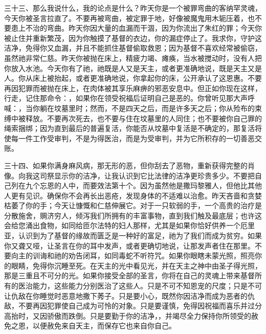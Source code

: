 三十三、那么我说什么，我的论点是什么？昨天你是一个被罪弯曲的客纳罕灵魂，今天你被圣言拉直了。不要再被弯曲，被定罪于地，好像被魔鬼用木轭压着，也不要患上不治的弯曲。昨天你因大量的血漏而干涸，因为你流出了朱红的罪；今天你被止住并重新繁茂，因为你触摸了基督的衣边，你的漏症停止了。我求你，守护这洁净，免得你又血漏，并且不能抓住基督偷取救恩；因为基督不喜欢经常被偷窃，虽然祂非常仁慈。昨天你被抛在床上，精疲力竭、瘫痪，当水被搅动时，没有人把你放入水池。今天你有了祂，祂既是人又是天主，或者更准确地说，既是天主又是人。你从床上被抬起，或者更准确地说，你拿起你的床，公开承认了这恩惠。不要再因犯罪而被抛在床上，在肉体被其享乐麻痹的邪恶安息中。但正如你现在这样，行走，记住那命令：，如果你在领受祝福后证明自己是恶的。你曾听见那大声呼喊：，当你躺在坟墓里时；然而，不是四天之后，而是许多天之后；你从殓布的束缚中被释放。不要再次死去，也不要与住在坟墓里的人同住；也不要被你自己罪的绳索捆绑；因为直到最后的普遍复活，你能否从坟墓中复活是不确定的，那复活将使每一件工作受审判，不是为得医治，而是为受审判，并为它所积存的一切善恶交账。\par

三十四、如果你满身麻风病，那无形的恶，但你刮去了恶物，重新获得完整的肖像。向我这司祭显示你的洁净，让我认识到它比法律的洁净更珍贵多少。不要把自己列在九个忘恩的人中，而要效法第十个。因为虽然他是撒玛黎雅人，但他比其他人更有见识。确保你不会再长出恶疮，发现身体的不适难以治愈。昨天吝啬和贪婪枯萎了你的手；今天让慷慨和仁慈伸展它。对于一只软弱的手，一个高贵的治疗是分散施舍，赒济穷人，倾泻我们所拥有的丰富事物，直到我们触及最底层；也许这会给您涌出食物，如同给匝尔法特的妇人那样，尤其是如果你恰好供养一个厄里亚，认识到为了基督的缘故而匮乏是一种好的富足，祂为了我们而成为贫穷。如果你又聋又哑，让圣言在你的耳中发声，或者更确切地说，让那发声者住在那里。不要向主的训诲和祂的劝告闭耳，如同毒蛇不听符咒。如果你眼瞎未蒙光照，照亮你的眼睛，免得你沉睡至死。在天主的光中看见光，并在天主之神中由圣子得光照，那是三重且不可分的光。如果你接受全部的圣言，你将在自己的灵魂上带来基督所有的医治能力，这些能力分别医治了这些人。只是不可不知恩宠的尺度；只是不可让仇敌在你睡觉时恶意地撒下莠子。只是要小心，既然你因洁净而成为恶者的仇敌，不要再因犯罪使自己成为可怜的对象。只是要谨慎，免得因祝福而喜乐并过分高抬时，又因骄傲而跌倒。只是要勤于你的洁净，，并竭尽全力保持你所领受的赦免之恩，以便赦免来自天主，而保存它也来自你自己。\par

